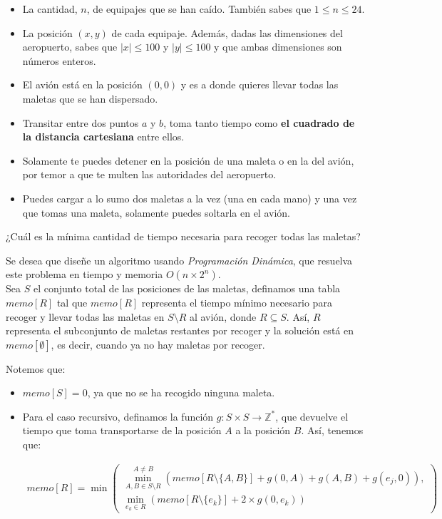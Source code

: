 \documentclass[letterpaper, 12pt]{article}
\begin{document}
\begin{enumerate}
\begin{itemize}
    \item La cantidad, $n$, de equipajes que se han caído. También sabes que $1 \leq n \leq 24$.

    \item La posición $(x, y)$ de cada equipaje. Además, dadas las dimensiones del aeropuerto, sabes que $|x| \leq 100$ y $|y| \leq 100$ y que ambas dimensiones son números enteros.
    \item El avión está en la posición $(0, 0)$ y es a donde quieres llevar todas las maletas que se han dispersado.
    \item Transitar entre dos puntos $a$ y $b$, toma tanto tiempo como \textbf{el cuadrado de la distancia cartesiana} entre ellos.
    \item Solamente te puedes detener en la posición de una maleta o en la del avión, por temor a que te multen las autoridades del aeropuerto.
    \item Puedes cargar a lo sumo dos maletas a la vez (una en cada mano) y una vez que tomas una maleta, solamente puedes soltarla en el avión.
\end{itemize}

¿Cuál es la mínima cantidad de tiempo necesaria para recoger todas las maletas?

Se desea que diseñe un algoritmo usando \emph{Programación Dinámica}, que resuelva este problema en tiempo y memoria $O(n \times 2^n)$. \\

Sea $S$ el conjunto total de las posiciones de las maletas, definamos una tabla $memo[R]$ tal que $memo[R]$ representa el tiempo mínimo necesario para recoger y llevar todas las maletas en $S \setminus R$ al avión, donde $R \subseteq S$. Así, $R$ representa el subconjunto de maletas restantes por recoger y la solución está en $memo[\emptyset]$, es decir, cuando ya no hay maletas por recoger.

Notemos que:


\begin{itemize}
    \item $memo[S] = 0$, ya que no se ha recogido ninguna maleta.
    \item Para el caso recursivo, definamos la función $g: S \times S \rightarrow \mathbb{Z}^*$, que devuelve el tiempo que toma transportarse de la posición $A$ a la posición $B$. Así, tenemos que:

    \begin{align*}
        memo[R] = \min \left( \begin{array}{l}
            \min_{A, B \in S\setminus R}^{A \neq B} \left( memo[R \setminus \{A, B\}] + g(0, A) + g(A, B) + g(e_j, 0) \right), \\
            \min_{e_k \in R} \left( memo[R \setminus \{e_k\}] + 2 \times g(0, e_k) \right)
        \end{array} \right)
    \end{align*}


\end{itemize}
\end{enumerate}
\end{document}
